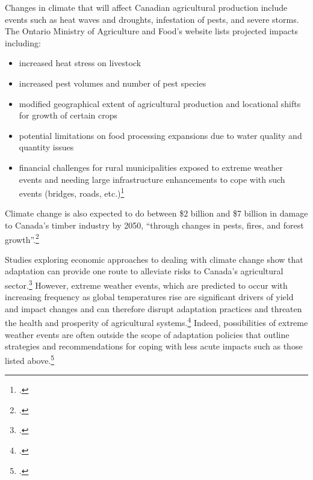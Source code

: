 Changes in climate that will affect Canadian agricultural production include events such as heat waves and droughts, infestation of pests, and severe storms.
The Ontario Ministry of Agriculture and Food's website lists projected impacts including:
\begin{itemize}
	\item increased heat stress on livestock
	\item increased pest volumes and number of pest species
	\item modified geographical extent of agricultural production and locational shifts for growth of certain crops
	\item potential limitations on food processing expansions due to water quality and quantity issues
	\item financial challenges for rural municipalities exposed to extreme weather events and needing large infrastructure enhancements to cope with such events (bridges, roads, etc.)\footcite{OntarioCCandAg}
\end{itemize}
Climate change is also expected to do between \$2 billion and \$7 billion in damage to Canada's timber industry by 2050, ``through changes in pests, fires, and forest growth''.\footcite[][p.16]{NRTEEPrice}



Studies exploring economic approaches to dealing with climate change show that adaptation can provide one route to alleviate risks to Canada's agricultural sector.\footcite{Amiraslany2010}
However, extreme weather events, which are predicted to occur with increasing frequency as global temperatures rise are significant drivers of yield and impact changes and can therefore disrupt adaptation practices and threaten the health and prosperity of agricultural systems.\footcite{IsikDevadoss2006}
Indeed, possibilities of extreme weather events are often outside the scope of adaptation policies that outline strategies and recommendations for coping with less acute impacts such as those listed above.\footcite[See for instance:][]{Malcolm2012}



